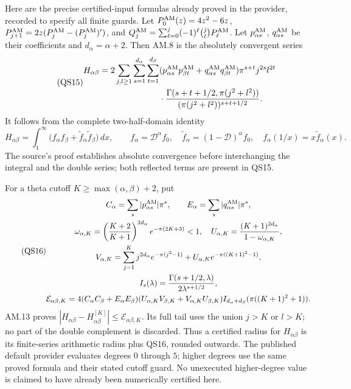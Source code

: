 \documentclass[11pt]{article}
\begin{document}
Here are the precise certified-input formulas already proved
in the provider, recorded to specify all finite guards.
Let \(P_0^{\rm AM}(z)=4z^2-6z\),
\(P_{j+1}^{\rm AM}=2z(P_j^{\rm AM}-(P_j^{\rm AM})')\), and
\(Q_j^{\rm AM}=\sum_{\ell=0}^j(-1)^\ell\binom j\ell
P_\ell^{\rm AM}\). Let \(p_{\alpha s}^{\rm AM}\),
\(q_{\alpha s}^{\rm AM}\) be their coefficients and
\(d_\alpha=\alpha+2\). Then AM.8 is the absolutely convergent series
\begin{equation}\tag{QS15}
\begin{aligned}
 H_{\alpha\beta}
 =2\sum_{j,l\ge1}\sum_{s=1}^{d_\alpha}
                    \sum_{t=1}^{d_\beta}
 &(p_{\alpha s}^{\rm AM}p_{\beta t}^{\rm AM}
     +q_{\alpha s}^{\rm AM}q_{\beta t}^{\rm AM})
        \pi^{s+t}j^{2s}l^{2t}\\
 &{}\cdot
 \frac{\Gamma(s+t+1/2,\pi(j^2+l^2))}
      {(\pi(j^2+l^2))^{s+t+1/2}} .
\end{aligned}
\end{equation}
It follows from the complete two-half-domain identity
\[
 H_{\alpha\beta}=\int_1^\infty
 \bigl(f_\alpha f_\beta+\widetilde f_\alpha\widetilde f_\beta\bigr)\,dx,
 \qquad f_\alpha=\mathcal D^\alpha f_0,\quad
 \widetilde f_\alpha=(1-\mathcal D)^\alpha f_0,
 \quad f_\alpha(1/x)=x\widetilde f_\alpha(x).
\]
The source's proof establishes absolute convergence before
interchanging the integral and the double series; both reflected
terms are present in QS15.

For a theta cutoff \(K\ge\max(\alpha,\beta)+2\), put
\begin{equation}\tag{QS16}
\begin{gathered}
 C_\alpha=\sum_s|p_{\alpha s}^{\rm AM}|\pi^s,\qquad
 E_\alpha=\sum_s|q_{\alpha s}^{\rm AM}|\pi^s,\\
 \omega_{\alpha,K}=
       \left(\frac{K+2}{K+1}\right)^{2d_\alpha}e^{-\pi(2K+3)}<1,
 \quad U_{\alpha,K}=\frac{(K+1)^{2d_\alpha}}{1-\omega_{\alpha,K}},\\
 V_{\alpha,K}=\sum_{j=1}^K j^{2d_\alpha}e^{-\pi(j^2-1)}
                 +U_{\alpha,K}e^{-\pi((K+1)^2-1)},\\
 I_s(\lambda)=\frac{\Gamma(s+1/2,\lambda)}
                          {2\lambda^{s+1/2}},\\
 \mathcal E_{\alpha\beta,K}
 =4(C_\alpha C_\beta+E_\alpha E_\beta)
 (U_{\alpha,K}V_{\beta,K}+V_{\alpha,K}U_{\beta,K})
 I_{d_\alpha+d_\beta}(\pi((K+1)^2+1)).
\end{gathered}
\end{equation}
AM.13 proves
\(|H_{\alpha\beta}-H_{\alpha\beta}^{[K]}|
\le\mathcal E_{\alpha\beta,K}\).
Its full tail uses the union \(j>K\) or \(l>K\); no part
of the double complement is discarded.
Thus a certified radius for \(H_{\alpha\beta}\) is its
finite-series arithmetic radius plus QS16, rounded outwards.
The published default provider evaluates degrees \(0\) through
\(5\); higher degrees use the same proved formula and their
stated cutoff guard. No unexecuted higher-degree value is
claimed to have already been numerically certified here.
\end{document}
